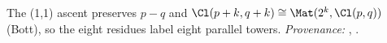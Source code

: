 The (1,1) ascent preserves $p - q$ and $\Cl(p+k, q+k) \cong \Mat(2^{k}, \Cl(p,q))$ (Bott), so the eight residues label eight parallel towers. \emph{Provenance:} \cite[Thms.~3.2, 3.6, Rem.~3.7]{ButlerT3}, \cite[\S7]{ButlerT1}.

